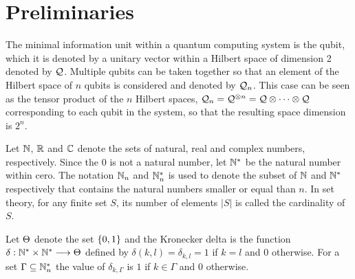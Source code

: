 \section{Preliminaries}
The minimal information unit within a quantum computing system is the qubit, which it is denoted by a unitary vector within a Hilbert space of dimension 2 denoted by $\mathcal{Q}$.
Multiple qubits can be taken together so that an element of the Hilbert space of $n$ qubits is considered and denoted by $\mathcal{Q}_n$.
This case can be seen as the tensor product of the $n$ Hilbert spaces, $\mathcal{Q}_n=\mathcal{Q}^{\otimes n}=\mathcal{Q}\otimes\dots\otimes\mathcal{Q}$ corresponding to each qubit in the system, so that the resulting space dimension is $2^n$.

Let $\mathbb{N}$, $\mathbb{R}$ and $\mathbb{C}$ denote the sets of natural, real and complex numbers, respectively.
Since the $0$ is not a natural number, let $\mathbb{N}^*$ be the natural number within cero.
The notation $\mathbb{N}_n$ and $\mathbb{N}^*_n$ is used to denote the subset of $\mathbb{N}$ and $\mathbb{N}^*$ respectively that contains the natural numbers smaller or equal than $n$.
In set theory, for any finite set $S$, its number of elements  $|S|$ is called the cardinality of $S$.

Let $\Theta$ denote the set $\{0,1\}$ and the Kronecker delta is the function $\delta:\mathbb{N}^*\times\mathbb{N}^*\longrightarrow\Theta$ defined by $\delta(k,l)=\delta_{k,l}=1$ if $k=l$ and $0$ otherwise.
For a set $\Gamma\subseteq\mathbb{N}^*_n$ the value of $\delta_{k,\Gamma}$ is $1$ if $k\in\Gamma$ and $0$ otherwise.